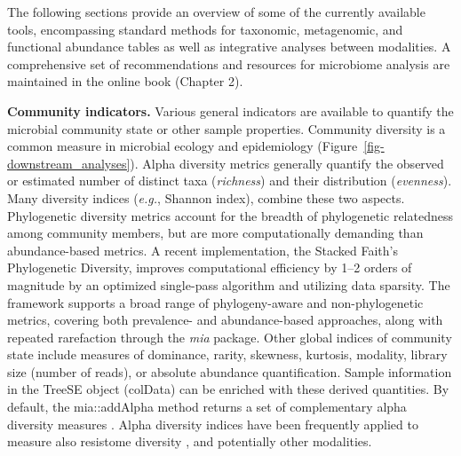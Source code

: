 \documentclass[
  sn-nature,
]{sn-jnl}
\begin{document}
The following sections provide an overview of some of the currently
available tools, encompassing standard methods for taxonomic,
metagenomic, and functional abundance tables as well as integrative
analyses between modalities. A comprehensive set of recommendations and
resources for microbiome analysis are maintained in the online book
(Chapter 2).

\textbf{Community indicators.} Various general indicators are available
to quantify the microbial community state or other sample properties.
Community diversity is a common measure in microbial ecology and
epidemiology \citep{bastiaanssen2023_1}
(Figure~\ref{fig-downstream_analyses}). Alpha diversity metrics
generally quantify the observed or estimated number of distinct taxa
(\emph{richness}) and their distribution (\emph{evenness}). Many
diversity indices (\emph{e.g.}, Shannon index), combine these two
aspects. Phylogenetic diversity metrics account for the breadth of
phylogenetic relatedness among community members, but are more
computationally demanding than abundance-based metrics. A recent
implementation, the Stacked Faith's Phylogenetic Diversity, improves
computational efficiency by 1--2 orders of magnitude
\citep{armstrong2021} by an optimized single-pass algorithm and
utilizing data sparsity. The framework supports a broad range of
phylogeny-aware and non-phylogenetic metrics, covering both prevalence-
and abundance-based approaches, along with repeated rarefaction
\citep{schloss2024b} through the \emph{mia} package. Other global
indices of community state include measures of dominance, rarity,
skewness, kurtosis, modality, library size (number of reads), or
absolute abundance quantification. Sample information in the TreeSE
object (colData) can be enriched with these derived quantities. By
default, the mia::addAlpha method returns a set of complementary alpha
diversity measures \citep{cassol2025}. Alpha diversity indices have been
frequently applied to measure also resistome diversity
\citep{lee2023, salehi2025}, and potentially other modalities.
\end{document}
